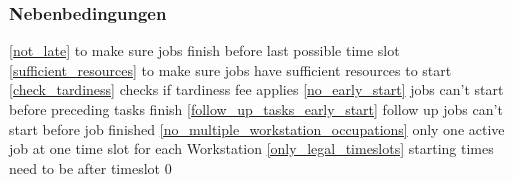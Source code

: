 \documentclass[a4paper,12pt,twoside]{scrreprt}
\begin{document}
\subsubsection*{Nebenbedingungen}
\begin{flushleft}
\autoref{not_late} to make sure jobs finish before last possible time slot\linebreak
\autoref{sufficient_resources} to make sure jobs have sufficient resources to start\linebreak
\autoref{check_tardiness} checks if tardiness fee applies\linebreak
\autoref{no_early_start} jobs can't start before preceding tasks finish\linebreak
\autoref{follow_up_tasks_early_start} follow up jobs can't start before job finished\linebreak
\autoref{no_multiple_workstation_occupations} only one active job at one time slot for each Workstation\linebreak
\autoref{only_legal_timeslots} starting times need to be after timeslot 0\linebreak
\end{flushleft}
\end{document}
